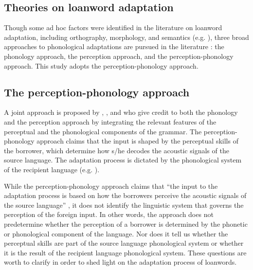 \documentclass[output=paper]{langscibook}
\begin{document}
\subsection{Theories on loanword adaptation}
Though some ad hoc factors were identified in the literature on loanword adaptation, including orthography, morphology, and semantics (e.g. \citealt{vendelin2004evidence, Adler2006, DavisCho2006, Miao2006, Smith2006a, Smith2006b}), three broad approaches to phonological adaptations are pursued in the literature \citep{lin2009loanword}: the phonology approach, the perception approach, and the perception-phonology approach. This study adopts the perception-phonology approach.

\subsection{The perception-phonology approach}
A joint approach is proposed by \citet{Silverman1992}, \citet{Yip1993, Yip2004}, and \citet{Rose1999a, Rose1999b} who give credit to both the phonology and the perception approach by integrating the relevant features of the perceptual and the phonological components of the grammar. The perception-phonology approach claims that the input is shaped by the perceptual skills of the borrower, which determine how s/he decodes the acoustic signals of the source language. The adaptation process is dictated by the phonological system of the recipient language (e.g. \citealt{Silverman1992, Yip1993, Yip2002, Yip2006, Steriade2001, Kang2003, Kenstowicz2003, KenstowiczSuchato2006, Miao2006}).

While the perception-phonology approach claims that “the input to the adaptation process is based on how the borrowers perceive the acoustic signals of the source language” \citep[2]{lin2009loanword}, it does not identify the linguistic system that governs the perception of the foreign input. In other words, the approach does not predetermine whether the perception of a borrower is determined by the phonetic or phonological component of the language. Nor does it tell us whether the perceptual skills are part of the source language phonological system or whether it is the result of the recipient language phonological system. These questions are worth to clarify in order to shed light on the adaptation process of loanwords.
\end{document}
